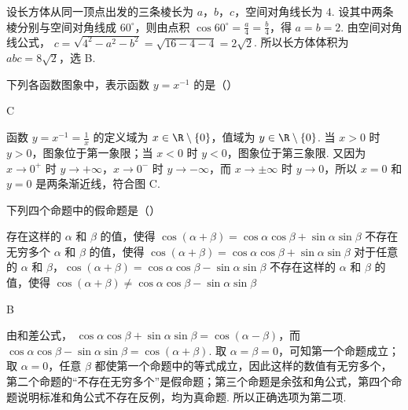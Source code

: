 \begin{solution}
设长方体从同一顶点出发的三条棱长为 \(a\)，\(b\)，\(c\)，空间对角线长为 \(4\). 设其中两条棱分别与空间对角线成 \(60^{\circ}\)，则由点积
\(\cos60^{\circ}=\frac{a}{4}=\frac{b}{4}\)，得 \(a=b=2\). 由空间对角线公式，
\(c=\sqrt{4^2-a^2-b^2}=\sqrt{16-4-4}=2\sqrt2\). 所以长方体体积为 \(abc=8\sqrt2\)，选 B.
\end{solution}

\begin{problem}
下列各函数图象中，表示函数 \(y = x^{-1}\) 的是（\quad）

    {}
    {}
    {}
\end{problem}

\begin{answer}
C
\end{answer}

\begin{solution}
函数 \(y=x^{-1}=\frac1x\) 的定义域为 \(x\in\R\mathbin{\backslash}\{0\}\)，值域为 \(y\in\R\mathbin{\backslash}\{0\}\). 当 \(x>0\) 时 \(y>0\)，图象位于第一象限；当 \(x<0\) 时 \(y<0\)，图象位于第三象限. 又因为 \(x\to0^+\) 时 \(y\to+\infty\)，\(x\to0^-\) 时 \(y\to-\infty\)，而 \(x\to\pm\infty\) 时 \(y\to0\)，所以 \(x=0\) 和 \(y=0\) 是两条渐近线，符合图 C.
\end{solution}

\begin{problem}
下列四个命题中的假命题是（\quad）

\choices
    {存在这样的 \(\alpha\) 和 \(\beta\) 的值，使得 \(\cos(\alpha + \beta) = \cos \alpha \cos \beta + \sin \alpha \sin \beta\)}
    {不存在无穷多个 \(\alpha\) 和 \(\beta\) 的值，使得 \(\cos(\alpha + \beta) = \cos \alpha \cos \beta + \sin \alpha \sin \beta\)}
    {对于任意的 \(\alpha\) 和 \(\beta\)，\(\cos(\alpha + \beta) = \cos \alpha \cos \beta - \sin \alpha \sin \beta\)}
    {不存在这样的 \(\alpha\) 和 \(\beta\) 的值，使得 \(\cos(\alpha + \beta) \neq \cos \alpha \cos \beta - \sin \alpha \sin \beta\)}
\end{problem}

\begin{answer}
B
\end{answer}

\begin{solution}
由和差公式，
\(\cos\alpha\cos\beta+\sin\alpha\sin\beta=\cos(\alpha-\beta)\)，而
\(\cos\alpha\cos\beta-\sin\alpha\sin\beta=\cos(\alpha+\beta)\). 取 \(\alpha=\beta=0\)，可知第一个命题成立；取 \(\alpha=0\)，任意 \(\beta\) 都使第一个命题中的等式成立，因此这样的数值有无穷多个，第二个命题的“不存在无穷多个”是假命题；第三个命题是余弦和角公式，第四个命题说明标准和角公式不存在反例，均为真命题. 所以正确选项为第二项.
\end{solution}


